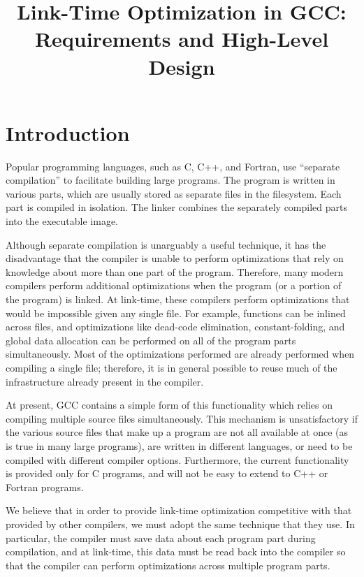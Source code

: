 \documentclass{article}
\begin{document}
\title{Link-Time Optimization in GCC: Requirements and High-Level Design}

\maketitle

\thispagestyle{empty}

\section{Introduction}
Popular programming languages, such as C, C++, and Fortran, use
``separate compilation'' to facilitate building large programs.
The program is written in various parts, which are usually stored as
separate files in the filesystem.  Each part is compiled in isolation.
The linker combines the separately compiled parts into the executable
image.  

Although separate compilation is unarguably a useful technique, it has
the disadvantage that the compiler is unable to perform optimizations
that rely on knowledge about more than one part of the program.
Therefore, many modern compilers perform additional optimizations when
the program (or a portion of the program) is linked.  At link-time,
these compilers perform optimizations that would be impossible given
any single file.  For example, functions can be inlined across files,
and optimizations like dead-code elimination, constant-folding, and
global data allocation can be performed on all of the program parts
simultaneously.  Most of the optimizations performed are already
performed when compiling a single file; therefore, it is in general
possible to reuse much of the infrastructure already present in the
compiler.

At present, GCC contains a simple form of this functionality which
relies on compiling multiple source files simultaneously.  This
mechanism is unsatisfactory if the various source files that make up a
program are not all available at once (as is true in many large
programs), are written in different languages, or need to be compiled
with different compiler options.  Furthermore, the current
functionality is provided only for C programs, and will not be easy to
extend to C++ or Fortran programs.

We believe that in order to provide link-time optimization competitive
with that provided by other compilers, we must adopt the same
technique that they use.  In particular, the compiler must save data
about each program part during compilation, and at link-time, this
data must be read back into the compiler so that the compiler can
perform optimizations across multiple program parts.
\end{document}
